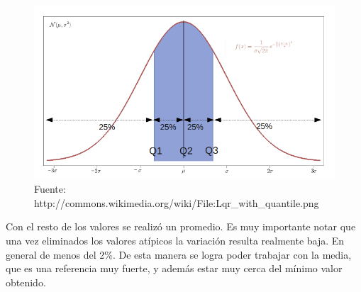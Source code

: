 \begin{figure}[h]
\begin{center}
  \includegraphics[scale=0.5]{secciones/consideraciones/imagenes/cuartiles.png}
\end{center}
\caption{Fuente: http://commons.wikimedia.org/wiki/File:Lqr\_with\_quantile.png}
\label{fig:cuariles}
\end{figure}

	Con el resto de los valores se realizó un promedio. Es muy importante notar que una vez eliminados los valores
atípicos la variación resulta realmente baja. En general de menos del 2\%. De esta manera se logra poder trabajar
con la media, que es una referencia muy fuerte, y además estar muy cerca del mínimo valor obtenido.

	

	

